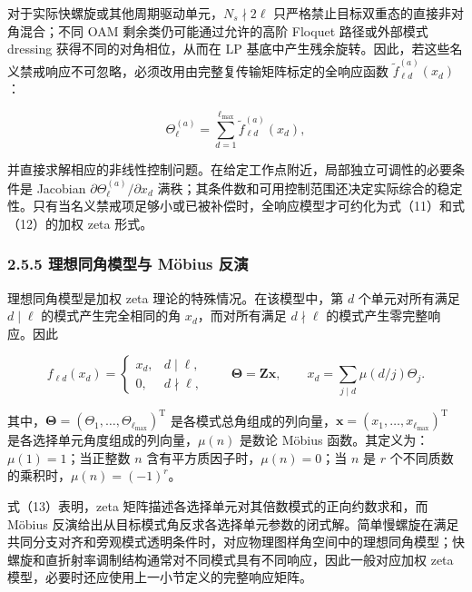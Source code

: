 \documentclass[
  UTF8,
  zihao=-4,
  fontset=fandol]{ctexart}
\begin{document}
对于实际快螺旋或其他周期驱动单元，\(N_s\nmid2\ell\)
只严格禁止目标双重态的直接非对角混合；不同 OAM
剩余类仍可能通过允许的高阶 Floquet 路径或外部模式 dressing
获得不同的对角相位，从而在 LP
基底中产生残余旋转。因此，若这些名义禁戒响应不可忽略，必须改用由完整复传输矩阵标定的全响应函数
\(\widetilde f_{\ell d}^{(a)}(x_d)\)：

\[
\Theta_\ell^{(a)}=\sum_{d=1}^{\ell_{\max}}\widetilde f_{\ell d}^{(a)}(x_d),
\]

并直接求解相应的非线性控制问题。在给定工作点附近，局部独立可调性的必要条件是
Jacobian \(\partial\Theta_\ell^{(a)}/\partial x_d\)
满秩；其条件数和可用控制范围还决定实际综合的稳定性。只有当名义禁戒项足够小或已被补偿时，全响应模型才可约化为式（11）和式（12）的加权
zeta 形式。

\hypertarget{ux7406ux60f3ux540cux89d2ux6a21ux578bux4e0e-muxf6bius-ux53cdux6f14}{%
\subsubsection{2.5.5 理想同角模型与 Möbius
反演}\label{ux7406ux60f3ux540cux89d2ux6a21ux578bux4e0e-muxf6bius-ux53cdux6f14}}

理想同角模型是加权 zeta 理论的特殊情况。在该模型中，第 \(d\)
个单元对所有满足 \(d\mid\ell\) 的模式产生完全相同的角
\(x_d\)，而对所有满足 \(d\nmid\ell\) 的模式产生零完整响应。因此

\[
f_{\ell d}(x_d)=
\begin{cases}
x_d,&d\mid\ell,\\
0,&d\nmid\ell,
\end{cases}
\qquad
\boldsymbol{\Theta}=\mathbf Z\mathbf x,
\qquad
x_d=\sum_{j\mid d}\mu(d/j)\Theta_j.
\tag{13}
\]

其中，\(\boldsymbol{\Theta}=(\Theta_1,\ldots,\Theta_{\ell_{\max}})^{\mathrm T}\)
是各模式总角组成的列向量，\(\mathbf x=(x_1,\ldots,x_{\ell_{\max}})^{\mathrm T}\)
是各选择单元角度组成的列向量，\(\mu(n)\) 是数论 Möbius
函数。其定义为：\(\mu(1)=1\)；当正整数 \(n\)
含有平方质因子时，\(\mu(n)=0\)；当 \(n\) 是 \(r\)
个不同质数的乘积时，\(\mu(n)=(-1)^r\)。

式（13）表明，zeta 矩阵描述各选择单元对其倍数模式的正向约数求和，而
Möbius
反演给出从目标模式角反求各选择单元参数的闭式解。简单慢螺旋在满足共同分支对齐和旁观模式透明条件时，对应物理图样角空间中的理想同角模型；快螺旋和直折射率调制结构通常对不同模式具有不同响应，因此一般对应加权
zeta 模型，必要时还应使用上一小节定义的完整响应矩阵。
\end{document}
